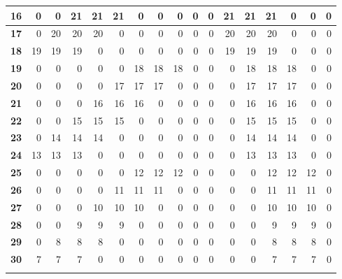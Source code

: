 \begin{table}[ht]
{\begin{tabular}{|l|r|r|r|r|r|r|r|r|r|r|r|r|r|r|r|r|}
				\textbf{16} & 0  & 0  & 21 & 21 & 21 & 0  & 0  & 0  & 0  & 0  & 21 & 21 & 21 & 0  & 0  & 0 \\ \hline
				\rowcolor[HTML]{E2EFDA} 
				\textbf{17} & 0  & 20 & 20 & 20 & 0  & 0  & 0  & 0  & 0  & 0  & 20 & 20 & 20 & 0  & 0  & 0 \\ \hline
				\rowcolor[HTML]{FFFFFF} 
				\textbf{18} & 19 & 19 & 19 & 0  & 0  & 0  & 0  & 0  & 0  & 0  & 19 & 19 & 19 & 0  & 0  & 0 \\ \hline
				\rowcolor[HTML]{E2EFDA} 
				\textbf{19} & 0  & 0  & 0  & 0  & 0  & 18 & 18 & 18 & 0  & 0  & 0  & 18 & 18 & 18 & 0  & 0 \\ \hline
				\rowcolor[HTML]{FFFFFF} 
				\textbf{20} & 0  & 0  & 0  & 0  & 17 & 17 & 17 & 0  & 0  & 0  & 0  & 17 & 17 & 17 & 0  & 0 \\ \hline
				\rowcolor[HTML]{E2EFDA} 
				\textbf{21} & 0  & 0  & 0  & 16 & 16 & 16 & 0  & 0  & 0  & 0  & 0  & 16 & 16 & 16 & 0  & 0 \\ \hline
				\rowcolor[HTML]{FFFFFF} 
				\textbf{22} & 0  & 0  & 15 & 15 & 15 & 0  & 0  & 0  & 0  & 0  & 0  & 15 & 15 & 15 & 0  & 0 \\ \hline
				\rowcolor[HTML]{E2EFDA} 
				\textbf{23} & 0  & 14 & 14 & 14 & 0  & 0  & 0  & 0  & 0  & 0  & 0  & 14 & 14 & 14 & 0  & 0 \\ \hline
				\rowcolor[HTML]{FFFFFF} 
				\textbf{24} & 13 & 13 & 13 & 0  & 0  & 0  & 0  & 0  & 0  & 0  & 0  & 13 & 13 & 13 & 0  & 0 \\ \hline
				\rowcolor[HTML]{E2EFDA} 
				\textbf{25} & 0  & 0  & 0  & 0  & 0  & 12 & 12 & 12 & 0  & 0  & 0  & 0  & 12 & 12 & 12 & 0 \\ \hline
				\rowcolor[HTML]{FFFFFF} 
				\textbf{26} & 0  & 0  & 0  & 0  & 11 & 11 & 11 & 0  & 0  & 0  & 0  & 0  & 11 & 11 & 11 & 0 \\ \hline
				\rowcolor[HTML]{E2EFDA} 
				\textbf{27} & 0  & 0  & 0  & 10 & 10 & 10 & 0  & 0  & 0  & 0  & 0  & 0  & 10 & 10 & 10 & 0 \\ \hline
				\rowcolor[HTML]{FFFFFF} 
				\textbf{28} & 0  & 0  & 9  & 9  & 9  & 0  & 0  & 0  & 0  & 0  & 0  & 0  & 9  & 9  & 9  & 0 \\ \hline
				\rowcolor[HTML]{E2EFDA} 
				\textbf{29} & 0  & 8  & 8  & 8  & 0  & 0  & 0  & 0  & 0  & 0  & 0  & 0  & 8  & 8  & 8  & 0 \\ \hline
				\rowcolor[HTML]{FFFFFF} 
				\textbf{30} & 7  & 7  & 7  & 0  & 0  & 0  & 0  & 0  & 0  & 0  & 0  & 0  & 7  & 7  & 7  & 0 \\ \hline
				\rowcolor[HTML]{E2EFDA} 

\end{tabular}}
\end{table}
